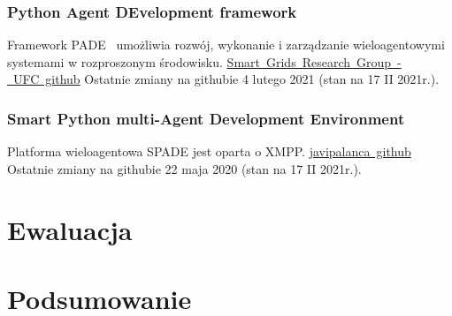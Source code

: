 \documentclass[11pt]{report}
\begin{document}
    \subsection{Python Agent DEvelopment framework}
    Framework PADE~\cite{Melo2019} umożliwia rozwój, wykonanie i zarządzanie wieloagentowymi systemami w rozproszonym środowisku.
    \href{https://github.com/grei-ufc/pade}{Smart~Grids~Research~Group~-~UFC~github}
    Ostatnie zmiany na githubie 4 lutego 2021 (stan na 17 II 2021r.).

    \subsection{Smart Python multi-Agent Development Environment}
    Platforma wieloagentowa SPADE jest oparta o XMPP\cite{Saint-Andre2007}.
    \href{https://github.com/javipalanca/spade}{javipalanca~github}
    Ostatnie zmiany na githubie 22 maja 2020 (stan na 17 II 2021r.).


    \chapter{Ewaluacja}\label{ch:ewaluacja}


    \chapter{Podsumowanie}\label{ch:podsumowanie}


    \newpage

    \printbibliography[title={Bibliografia}]
\end{document}
